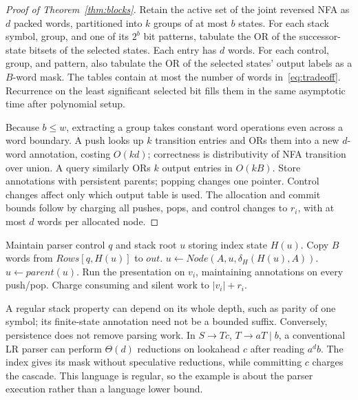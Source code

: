 \documentclass[manuscript,screen,11pt,nonacm]{acmart}
\theoremstyle{definition}\newtheorem{definition}{Definition}
\begin{document}
\begin{proof}[Proof of Theorem~\ref{thm:blocks}]
Retain the active set of the joint reversed NFA as $d$ packed words, partitioned into $k$ groups of at most $b$ states. For each stack symbol, group, and one of its $2^b$ bit patterns, tabulate the OR of the successor-state bitsets of the selected states. Each entry has $d$ words. For each control, group, and pattern, also tabulate the OR of the selected states' output labels as a $B$-word mask. The tables contain at most the number of words in~\eqref{eq:tradeoff}. Recurrence on the least significant selected bit fills them in the same asymptotic time after polynomial setup.

Because $b\le w$, extracting a group takes constant word operations even across a word boundary. A push looks up $k$ transition entries and ORs them into a new $d$-word annotation, costing $O(kd)$; correctness is distributivity of NFA transition over union. A query similarly ORs $k$ output entries in $O(kB)$. Store annotations with persistent parents; popping changes one pointer. Control changes affect only which output table is used. The allocation and commit bounds follow by charging all pushes, pops, and control changes to $r_i$, with at most $d$ words per allocated node.
\end{proof}

\begin{algorithm}[t]
\caption{VIABLE with a determinized stack classifier}
\begin{algorithmic}[1]
\State Maintain parser control $q$ and stack root $u$ storing index state $H(u)$.
 \State Copy $B$ words from $Rows[q,H(u)]$ to $out$.
\EndFunction
{}
 \State $u\gets Node(A,u,\delta_H(H(u),A))$.
\EndFunction
{}\State $u\gets parent(u)$.\EndFunction
{}
 \State Run the presentation on $v_i$, maintaining annotations on every push/pop.
 \State Charge consuming and silent work to $|v_i|+r_i$.
\EndFunction
\end{algorithmic}
\end{algorithm}

A regular stack property can depend on its whole depth, such as parity of one symbol; its finite-state annotation need not be a bounded suffix. Conversely, persistence does not remove parsing work. In $S\to Tc$, $T\to aT\mid b$, a conventional LR parser can perform $\Theta(d)$ reductions on lookahead $c$ after reading $a^db$. The index gives its mask without speculative reductions, while committing $c$ charges the cascade. This language is regular, so the example is about the parser execution rather than a language lower bound.
\end{document}
